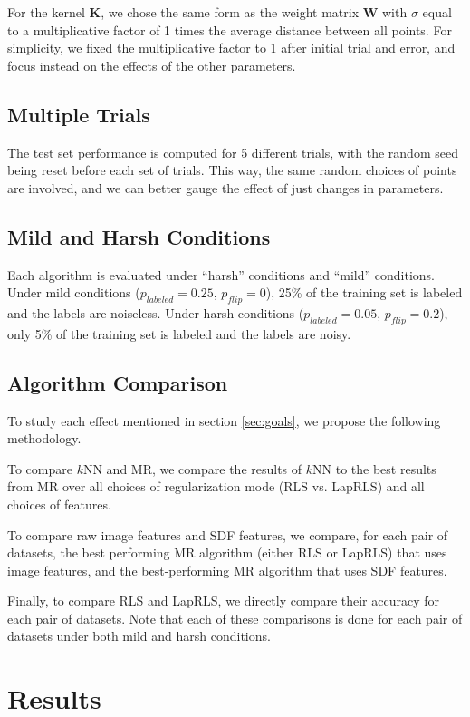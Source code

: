 \documentclass[anon,11pt]{9520} %
\newcommand{\mb}{\mathbf}
\begin{document}
For the kernel $\mb K$, we chose the same form as the weight matrix $\mb W$
with $\sigma$ equal to a multiplicative factor of 1 times the average distance
between all points. For simplicity, we fixed the multiplicative factor to 1
after initial trial and error, and focus instead on the effects of the other
parameters.

\subsection{Multiple Trials}
The test set performance is computed for 5 different trials, with the random
seed being reset before each set of trials. This way, the same random choices of
points are involved, and we can better gauge the effect of just changes in
parameters.

\subsection{Mild and Harsh Conditions}
Each algorithm is evaluated under ``harsh'' conditions and ``mild'' conditions. Under mild conditions
 ($p_{labeled} = 0.25$, $p_{flip} = 0$), 25\% of the training set is labeled
and the labels are noiseless. Under harsh conditions ($p_{labeled} = 0.05$, $p_{flip} =
0.2$), only 5\% of the training set is labeled and the labels are noisy.

\subsection{Algorithm Comparison}
To study each effect mentioned in section \ref{sec:goals}, we propose the
following methodology.

To compare $k$NN and MR, we compare the results of $k$NN
to the best results from MR over all choices of regularization mode (RLS
vs. LapRLS) and all choices of features.

To compare raw image features and SDF features, we compare, for each pair of
datasets, the best performing MR algorithm (either RLS or LapRLS) that uses image
features, and the best-performing MR algorithm that uses SDF features.

Finally, to compare RLS and LapRLS, we directly compare their accuracy for each pair of
datasets. Note that each of these comparisons is done for each pair of datasets under both
mild and harsh conditions.

\section{Results}
\end{document}
